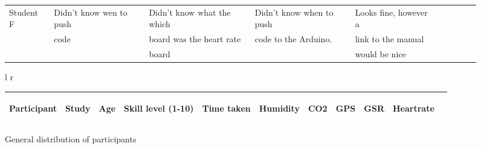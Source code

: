 \documentclass[conference]{IEEEtran}
\begin{document}
\begin{enumerate}
\begin{enumerate}
\begin{figure*}[!ht]
\begin{tabular}{ | l | l | l | l | l | l | l | l | l | l | }
			Student F		& Didn't know wen to push	& Didn't know what the which	& Didn't know when to push	& Looks fine, however a	\\ 
							& code						& board was the heart rate 		& code to the Arduino.		& link to the manual	\\
							&  							& board							& 							& would be nice			\\ \hline
			\end{tabular}
			\caption{General distribution of participants}
			\begin{tabular}{ l r }
					\\
					\begin{tabular}{ | l | l | l | l | l | l | l | l | l | l | l }
						\hline
						\begin{turn}{-90}Participant\end{turn}			&
						\begin{turn}{-90}Study\end{turn}				&
						\begin{turn}{-90}Age\end{turn}					&
						\begin{turn}{-90}Skill level (1-10) \end{turn}&
						\begin{turn}{-90}Time taken\end{turn}			&
						\begin{turn}{-90}Humidity\end{turn}			&
						\begin{turn}{-90}CO2\end{turn}					&
						\begin{turn}{-90}GPS\end{turn}					&
						\begin{turn}{-90}GSR\end{turn}					&
						\begin{turn}{-90}Heartrate\end{turn}			
						\\ \hline \hline


\end{tabular}
\end{tabular}
\end{figure*}
\end{enumerate}
\end{enumerate}
\end{document}
